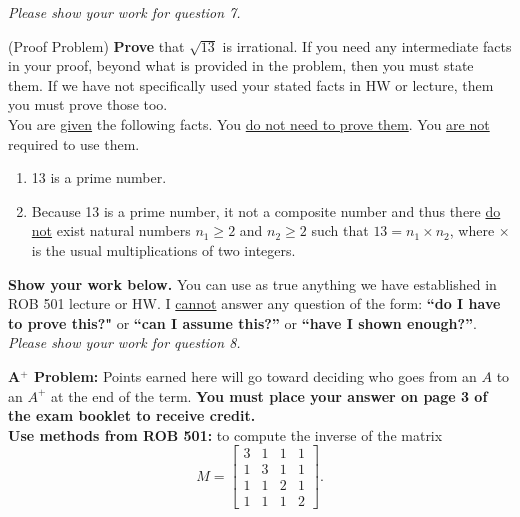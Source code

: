 \documentclass[letterpaper]{article}
\begin{document}
\newpage

\newpage
\textit{Please show your work for question 7.}
\newpage



 (Proof Problem)  \textbf{Prove} that $\sqrt{13}$ is irrational. If you need any intermediate facts in your proof, beyond what is provided in the problem, then you must state them.  If we have not specifically used your stated facts in HW or lecture, them you must prove those too. \\

You are \underline{given} the following facts. You \underline{do not need to prove them}. You \underline{are not} required to use them.
\begin{enumerate}
\setlength{\itemsep}{.15in}
\renewcommand{\labelenumi}{(\alph{enumi})}
\setlength{\itemsep}{.1in}
\item 13 is a prime number.
\item Because 13 is a prime number, it not a composite number and thus there \underline{do not} exist natural numbers $n_1\ge 2$ and $n_2\ge 2$ such that $13 = n_1 \times n_2$, where $\times$ is the usual multiplications of two integers.
\end{enumerate}


\textbf{Show your work below.} You can use as true anything we have established in ROB 501 lecture or HW. I \underline{cannot} answer any question of the form: \textbf{``do I have to prove this?"} or \textbf{``can I assume this?''} or \textbf{``have I shown enough?''}.\\



\newpage
\textit{Please show your work for question 8.}
\newpage


\newpage

  \textbf{A$^+$ Problem: } Points earned here will go toward deciding who goes from an $A$ to an $A^+$ at the end of the term. \textbf{You must place your answer on page 3 of the exam booklet to receive credit.}\\

\noindent \textbf{Use methods from ROB 501:} to compute the inverse of the matrix
$$M= \left[ \begin{array}{cccc} 3 & 1 & 1 & 1\\ 1 & 3& 1 & 1\\ 1 & 1 & 2 & 1 \\ 1& 1& 1& 2 \end{array} \right].$$
\end{document}
